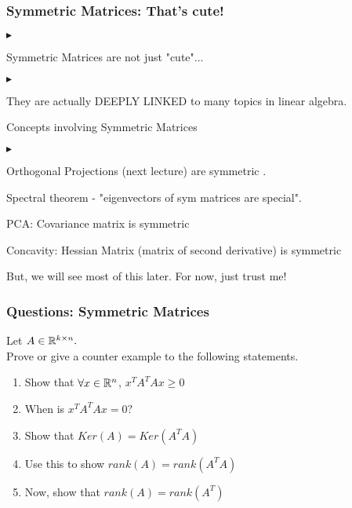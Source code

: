 \documentclass{beamer}
\renewenvironment{itemize}
\renewenvironment{enumerate}%
{\begin{list}{\arabic{enumi}.}%
      {\setlength{\leftmargin}{2.5em}%
       \setlength{\itemsep}{-\parsep}%
       \setlength{\topsep}{-\parskip}%
       \usecounter{enumi}}%
 }{\end{list}}
\renewenvironment{itemize}%
{\begin{list}{$\blacktriangleright$}%
      {\setlength{\leftmargin}{2.5em}%
       \setlength{\itemsep}{-\parsep}%
       \setlength{\topsep}{-\parskip}%
       \usecounter{enumi}}%
 }{\end{list}}
\begin{document}
\begin{frame}
\frametitle{Symmetric Matrices: That's cute!}
\begin{itemize}

\item Symmetric Matrices are not just "cute"...\\
	\begin{itemize}
	\item They are actually DEEPLY LINKED to many topics in linear algebra.\\
	\end{itemize}
\item Concepts involving Symmetric Matrices
\begin{itemize}
\item Orthogonal Projections (next lecture) are symmetric .\\
\item Spectral theorem - "eigenvectors of sym matrices are special".\\
\item PCA: Covariance matrix is symmetric
\item Concavity: Hessian Matrix (matrix of second derivative) is symmetric
\end{itemize}
\item But, we will see most of this later. For now, just trust me!
\end{itemize}
\end{frame}

\begin{frame}
\frametitle{Questions: Symmetric Matrices}
Let $A\in \mathbb{R}^{k \times n}.$\\
Prove or give a counter example to the following statements.
\begin{enumerate}
\item Show that $\forall x\in\mathbb{R}^n$, $ x^TA^TAx\geq0$
\item When is $x^TA^TAx = 0?$
\item Show that $Ker(A) = Ker(A^TA)$
\item Use this to show $rank(A)=rank(A^TA)$
\item Now, show that $rank(A) = rank(A^T)$
\end{enumerate}
\end{frame}
\end{document}
